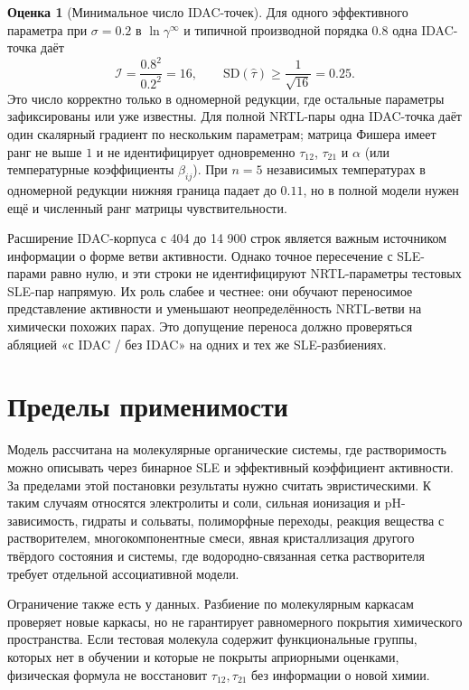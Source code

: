 \documentclass[11pt]{article}
\theoremstyle{definition}
\newtheorem{estimate}{Оценка}[section]
\begin{document}
\begin{estimate}[Минимальное число IDAC-точек]
Для одного эффективного параметра при $\sigma = 0.2$ в $\ln\gamma^\infty$ и типичной производной порядка $0.8$ одна IDAC-точка даёт
\begin{equation*}
    \mathcal I = \frac{0.8^2}{0.2^2}=16,
    \qquad
    \mathrm{SD}(\hat\tau)\ge\frac{1}{\sqrt{16}}=0.25.
\end{equation*}
Это число корректно только в одномерной редукции, где остальные параметры зафиксированы или уже известны. Для полной NRTL-пары одна IDAC-точка даёт один скалярный градиент по нескольким параметрам; матрица Фишера имеет ранг не выше $1$ и не идентифицирует одновременно $\tau_{12}$, $\tau_{21}$ и $\alpha$ (или температурные коэффициенты $\beta_{ij}$). При $n = 5$ независимых температурах в одномерной редукции нижняя граница падает до $0.11$, но в полной модели нужен ещё и численный ранг матрицы чувствительности.

Расширение IDAC-корпуса с 404 до 14 900 строк является важным источником информации о форме ветви активности. Однако точное пересечение с SLE-парами равно нулю, и эти строки не идентифицируют NRTL-параметры тестовых SLE-пар напрямую. Их роль слабее и честнее: они обучают переносимое представление активности и уменьшают неопределённость NRTL-ветви на химически похожих парах. Это допущение переноса должно проверяться абляцией «с IDAC / без IDAC» на одних и тех же SLE-разбиениях.
\end{estimate}

\section{Пределы применимости}
\label{app:limits}

Модель рассчитана на молекулярные органические системы, где растворимость можно описывать через бинарное SLE и эффективный коэффициент активности. За пределами этой постановки результаты нужно считать эвристическими. К таким случаям относятся электролиты и соли, сильная ионизация и pH-зависимость, гидраты и сольваты, полиморфные переходы, реакция вещества с растворителем, многокомпонентные смеси, явная кристаллизация другого твёрдого состояния и системы, где водородно-связанная сетка растворителя требует отдельной ассоциативной модели.

Ограничение также есть у данных. Разбиение по молекулярным каркасам проверяет новые каркасы, но не гарантирует равномерного покрытия химического пространства. Если тестовая молекула содержит функциональные группы, которых нет в обучении и которые не покрыты априорными оценками, физическая формула не восстановит $\tau_{12},\tau_{21}$ без информации о новой химии.
\end{document}
